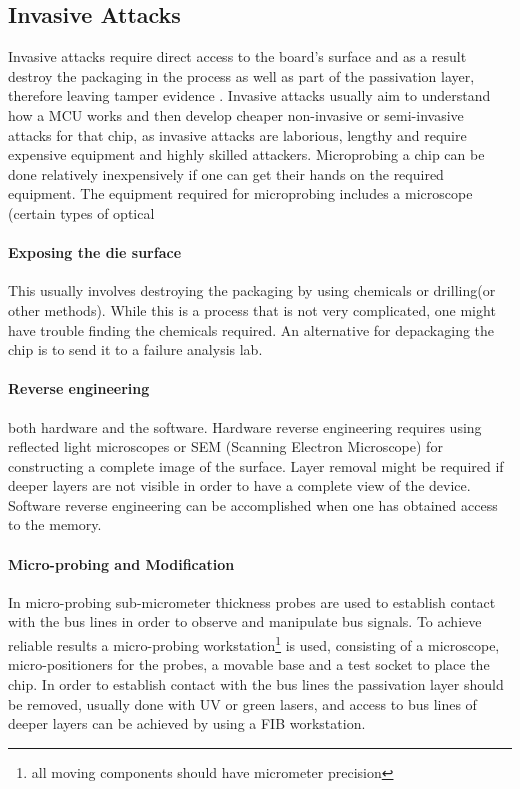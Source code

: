 	\subsection{Invasive Attacks}
	Invasive attacks require direct access to the board's surface and as a result destroy the packaging in the process as well as part of the passivation layer, therefore leaving tamper evidence\citep{sergei:thesis} \citep{hwre}. Invasive attacks usually aim to understand how a MCU works and then develop cheaper non-invasive or semi-invasive attacks for that chip, as invasive attacks are laborious, lengthy and require expensive equipment and highly skilled attackers\citep{sergei:thesis}. Microprobing a chip can be done relatively inexpensively if one can get their hands on the required equipment. The equipment required for microprobing includes a microscope (certain types of optical 
	
	\paragraph{Exposing the die surface} This usually involves destroying the packaging by using chemicals or drilling(or other methods). While this is a process that is not very complicated\citep{sergei:thesis}, one might have trouble finding the chemicals required. An alternative for depackaging the chip is to send it to a failure analysis lab\citep{website:hacking_the_pic}.
	
	\paragraph{Reverse engineering} both hardware and the software. Hardware reverse engineering requires using reflected light microscopes or SEM (Scanning Electron Microscope) for constructing a complete image of the surface. Layer removal might be required if deeper layers are not visible in order to have a complete view of the device. Software reverse engineering can be accomplished when one has obtained access to the memory.
	
	\paragraph{Micro-probing and Modification} In micro-probing sub-micrometer thickness probes are used to establish contact with the bus lines in order to observe and manipulate bus signals. To achieve reliable results a micro-probing workstation\footnote{all moving components should have micrometer precision} is used, consisting of a microscope, micro-positioners for the probes, a movable base and a test socket to place the chip. In order to establish contact with the bus lines the passivation layer should be removed, usually done with UV or green lasers, and access to bus lines of deeper layers can be achieved by using a FIB workstation.
	
